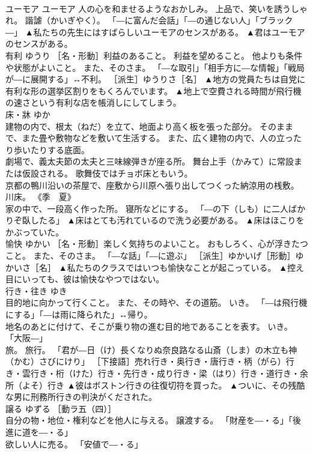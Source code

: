 \documentclass[8pt]{extreport}
\begin{document}
\begin{CJK}{UTF8}{min}
\\	ユーモア	ユーモア	人の心を和ませるようなおかしみ。 上品で、笑いを誘うしゃれ。 諧謔（かいぎやく）。 「―に富んだ会話」「―の通じない人」「ブラック―」	▲私たちの先生にはすばらしいユーモアのセンスがある。 ▲君はユーモアのセンスがある。
\\	有利	ゆうり	［名・形動］利益のあること。 利益を望めること。 他よりも条件や状態がよいこと。 また、そのさま。 「―な取引」「相手方に―な情報」「戦局が―に展開する」↔不利。 ［派生］ゆうりさ［名］	▲地方の党員たちは自党に有利な形の選挙区割りをもくろんでいます。 ▲地上で空費される時間が飛行機の速さという有利な店を帳消しにしてしまう。
\\	床・牀	ゆか	
\\	建物の内で、根太（ねだ）を立て、地面より高く板を張った部分。 そのままで、また畳や敷物などを敷いて生活する。 また、広く建物の内で、人の立ったり歩いたりする底面。 
\\	劇場で、義太夫節の太夫と三味線弾きが座る所。 舞台上手（かみて）に常設または仮設される。 歌舞伎ではチョボ床ともいう。 
\\	京都の鴨川沿いの茶屋で、座敷から川原へ張り出してつくった納涼用の桟敷。 川床。 《季　夏》 
\\	家の中で、一段高く作った所。 寝所などにする。 「―の下（しも）に二人ばかりぞ臥したる」	▲床はとても汚れているので洗う必要がある。 ▲床はほこりをかぶっていた。
\\	愉快	ゆかい	［名・形動］楽しく気持ちのよいこと。 おもしろく、心が浮きたつこと。 また、そのさま。 「―な話」「―に遊ぶ」 ［派生］ゆかいげ［形動］ゆかいさ［名］	▲私たちのクラスではいつも愉快なことが起こっている。 ▲控え目にいっても、彼は愉快なやつではない。
\\	行き・往き	ゆき	
\\	目的地に向かって行くこと。 また、その時や、その道筋。 いき。 「―は飛行機にする」「―は雨に降られた」↔帰り。 
\\	地名のあとに付けて、そこが乗り物の進む目的地であることを表す。 いき。 「大阪―」 
\\	旅。 旅行。 「君が―日（け）長くなりぬ奈良路なる山斎（しま）の木立も神（かむ）さびにけり」 ［下接語］売れ行き・奥行き・唐行き・柄（がら）行き・雲行き・桁（けた）行き・先行き・成り行き・梁（はり）行き・道行き・余所（よそ）行き	▲彼はボストン行きの往復切符を買った。 ▲ついに、その残酷な男に刑務所行きの判決がくだされた。
\\	譲る	ゆずる	［動ラ五（四）］ 
\\	自分の物・地位・権利などを他人に与える。 譲渡する。 「財産を―・る」「後進に道を―・る」 
\\	欲しい人に売る。 「安値で―・る」 

\end{CJK}
\end{document}
